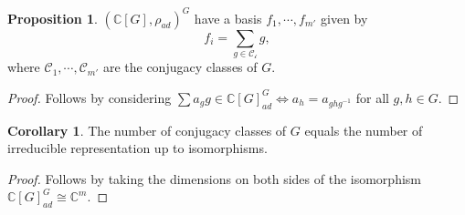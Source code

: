\documentclass[]{article}
\theoremstyle{definition}
\newtheorem{corollary}{Corollary}[theorem]
\theoremstyle{definition}
\newtheorem{proposition}{Proposition}[section]
\begin{document}
\begin{proposition}
  \((\mathbb{C}[G], \rho_{ad})^G\) have a basis \(f_1, \cdots, f_{m'}\) given 
  by 
  \[f_i = \sum_{g \in \mathcal{C_i}}g,\]
  where \(\mathcal{C}_1, \cdots, \mathcal{C}_{m'}\) are the conjugacy classes 
  of \(G\).
\end{proposition}
\begin{proof}
  Follows by considering \(\sum a_g g \in \mathbb{C}[G]_{ad}^G \iff a_h = a_{ghg^{-1}}\) 
  for all \(g, h \in G\).
\end{proof}

\begin{corollary}
  The number of conjugacy classes of \(G\) equals the number of irreducible 
  representation up to isomorphisms.
\end{corollary}
\begin{proof}
  Follows by taking the dimensions on both sides of the isomorphism 
  \(\mathbb{C}[G]_{ad}^G \cong \mathbb{C}^m\).
\end{proof}
\end{document}
